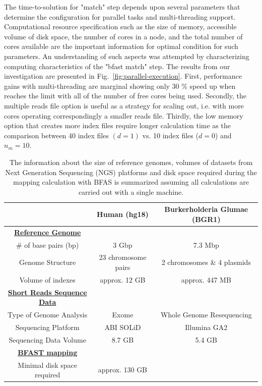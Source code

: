 \documentclass[12pt]{article}
\begin{document}
The time-to-solution for "match" step depends upon several parameters that determine the configuration for parallel tasks and multi-threading support.  Computational resource specification such as the size of memory, accessible volume of disk space, the number of cores in a node, and the total number of cores available are the important information for optimal condition for such parameters.  An understanding of such aspects was attempted by characterizing computing characteristics of the "bfast match" step.  The results from our investigation are presented  in Fig.~\ref{fig:parallel-execution}. First, performance gains with multi-threading are marginal showing only 30 \% speed up when reaches the limit with all of the number of free cores being used.  
Secondly, the multiple reads file option is useful as a strategy for scaling out, i.e. with more cores operating correspondingly a smaller reads file.  Thirdly, the low memory option that creates more index files require longer calculation time as the comparison between 40 index files $(d = 1)$ vs. 10 index files ($ d = 0 $) and $n_m = 10$.   





\begin{table}
\begin{tabular}{|ccc|} 
  \hline 
   & Human (hg18) & Burkerholderia Glumae (BGR1)  \\ \hline
 \underline{\textbf{Reference Genome}}   \\
    \# of base pairs (bp) &  3 Gbp & 7.3 Mbp \\
   Genome Structure &   23 chromosome pairs  & 2 chromosomes \& 4 plasmids  \\  
    Volume of indexes  & approx. 12 GB  & approx. 447 MB  \\
    \underline{ \textbf{Short Reads Sequence Data}}   \\
  Type of Genome Analysis &  Exome  & Whole Genome Resequencing \\
  Sequencing Platform & ABI SOLiD  &  Illumina GA2 \\
  Sequencing Data Volume  & 8.7 GB & 5.4 GB \\
  \underline{ \textbf{BFAST mapping} }  \\
  Minimal disk space required  &  approx. 130 GB   &       \\

\hline
\end{tabular} \caption{The information about the size of reference genomes, volumes of datasets from Next Generation Sequencing (NGS) platforms and disk space required during the mapping calculation with BFAS is summarized assuming all calculations are carried out with a single machine.}
 \label{table:two-genomes} 
\end{table}
\end{document}
